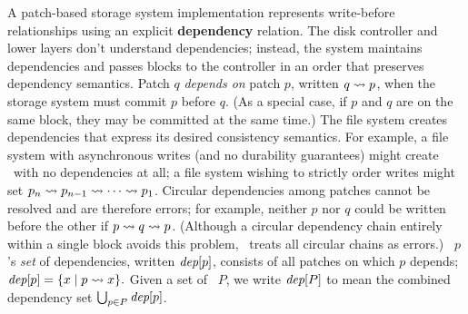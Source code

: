 A patch-based storage system implementation represents write-before
 relationships using an explicit \textbf{dependency} relation.
%
The disk controller and lower layers don't understand dependencies; instead,
 the system
 maintains dependencies and passes blocks to the controller in an
 order that preserves dependency semantics.
%
Patch $q$ \emph{depends on} patch $p$, written $q \leadsto p$,
 when the storage system must commit $p$ before $q$.
%
(As a special case, if $p$ and $q$ are on the same block, they may be
 committed at the same time.)
%
The file system creates dependencies that express its desired consistency
 semantics.
%
For example, a file system with asynchronous writes (and no durability
 guarantees) might create \patches\ with no dependencies at all;
%
a file system wishing to strictly order writes might set
 $p_n \leadsto p_{n-1} \leadsto \cdots \leadsto p_1$.
%
%
%
Circular dependencies among patches cannot be resolved and are therefore
 errors;  for example, neither $p$ nor $q$ could be written before the
 other if $p \leadsto q \leadsto p$.
%
(Although a circular dependency chain entirely within a single block avoids
 this problem, \Kudos\ treats all circular chains as errors.)
%
\Patch\ $p$'s \emph{set} of dependencies, written $\textit{dep}[p]$, consists
 of all patches on which $p$ depends;
%
\( \textit{dep}[p] = \{ x \mid p \leadsto x \}. \)
%
Given a set of \patches\ $P$, we write $\textit{dep}[P]$ to mean the
 combined dependency set $\bigcup_{p\in P} \textit{dep}[p]$. 


